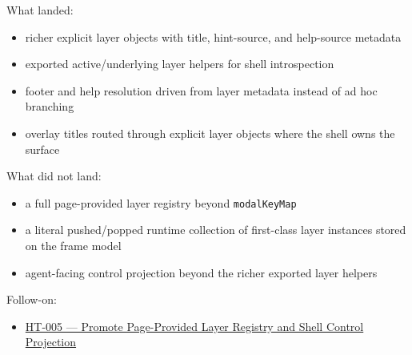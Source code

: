What landed:

\begin{itemize}
\tightlist
\item
  richer explicit layer objects with title, hint-source, and help-source metadata
\item
  exported active/underlying layer helpers for shell introspection
\item
  footer and help resolution driven from layer metadata instead of ad hoc branching
\item
  overlay titles routed through explicit layer objects where the shell owns the surface
\end{itemize}

What did not land:

\begin{itemize}
\tightlist
\item
  a full page-provided layer registry beyond \texttt{m\allowbreak{}o\allowbreak{}d\allowbreak{}a\allowbreak{}l\allowbreak{}K\allowbreak{}e\allowbreak{}y\allowbreak{}M\allowbreak{}a\allowbreak{}p}
\item
  a literal pushed/popped runtime collection of first-class layer instances stored on the frame model
\item
  agent-facing control projection beyond the richer exported layer helpers
\end{itemize}

Follow-on:

\begin{itemize}
\tightlist
\item
  \href{https://github.com/flyingrobots/bijou/blob/cbd70612140e7a450d764b3c7be1c6af878b99bc/docs/method/graveyard/legacy-backlog/HT-005-promote-page-provided-layer-registry-and-shell-control-projection.md}{HT-005 --- Promote Page-Provided Layer Registry and Shell Control Projection}
\end{itemize}

